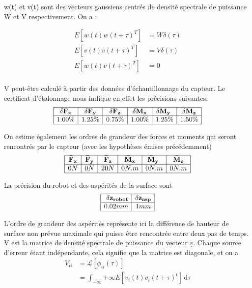 \documentclass[12pt,twoside,a4paper]{article}
\newcommand\ul[1]{\underline{#1}}
\begin{document}
 \vspace{0.5cm}


w(t) et v(t) sont des vecteurs gaussiens centrés de densité spectrale de puissance W et V respectivement. On a :

$$
\begin{array}{ll}
E[w(t) w(t+\tau)^T ] &= W \delta(\tau) \\
E[v(t) v(t+\tau)^T ] &= V \delta(\tau)  \\
E[w(t) v(t+\tau)^T ] &= 0  \\
\end{array}
$$

\vspace{1cm}

V peut-être calculé à partir des données d'échantillonnage du capteur. Le certificat d'étalonnage nous indique en effet les précisions suivantes:
$$
\begin{array}{|c|c|c|c|c|c|}	
	\hline
	\bold{\delta F_x} & \bold{\delta F_y} & \bold{\delta F_z} & \bold{\delta M_x} & \bold{\delta M_y} & \bold{\delta M_z} \\
	\hline 
	1.00\% & 1.25\% & 0.75\% & 1.00\% & 1.25\% & 1.50\% \\
	\hline
\end{array}
$$

On estime également les ordres de grandeur des forces et moments qui seront rencontrés par le capteur (avec les hypothèses émises précédemment)
$$
\begin{array}{|c|c|c|c|c|c|}	
	\hline
	\bold{\bar{F}_x} & \bold{\bar{F}_y} & \bold{\bar{F}_z} & \bold{\bar{M}_x} & \bold{\bar{M}_y} & \bold{\bar{M}_z} \\
	\hline 
	0N & 0N & 20N & 0N.m & 0N.m & 0N.m \\
	\hline
\end{array}
$$

La précision du robot et des aspérités de la surface sont 
$$
\begin{array}{|c|c|}
\hline 
\bold{\delta z_{robot}} & \bold{\delta z_{asp}} \\
\hline 
0.02mm & 1mm \\
\hline
\end{array}
$$

L'ordre de grandeur des aspérités représente ici la différence de hauteur de surface non prévue maximale qui puisse être rencontrée entre deux pas de temps.\\

\vspace{1cm}
V est la matrice de densité spectrale de puissance du vecteur $\ul{v}$. Chaque source d'erreur étant indépendante, cela signifie que la matrice est diagonale, et on a 
$$ 
\begin{array}{ll}
V_{ii} &= \mathcal{L}[\phi_{ii}(\tau)] \\
&= \int_{-\infty}{+\infty} E[v_{i}(t)v_{i}(t+\tau)^{t}] \, \mathrm{d}\tau
\end{array}
$$
\end{document}

